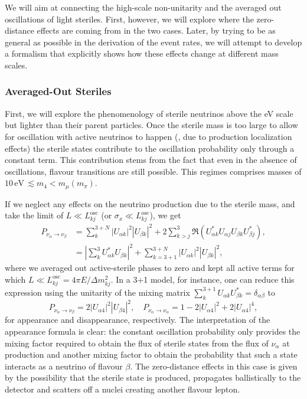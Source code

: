We will aim at connecting the high-scale non-unitarity and the averaged out oscillations of light steriles. First, however, we will explore where the zero-distance effects are coming from in the two cases. Later, by trying to be as general as possible in the derivation of the event rates, we will attempt to develop a formalism that explicitly shows how these effects change at different mass scales. 

\subsubsection{Averaged-Out Steriles} First, we will explore the phenomenology of sterile neutrinos above the eV scale but lighter than their parent particles. Once the sterile mass is too large to allow for oscillation with active neutrinos to happen (\eg, due to production localization effects) the sterile states contribute to the oscillation probability only through a constant term. This contribution stems from the fact that even in the absence of oscillations, flavour transitions are still possible. This regimes comprises masses of $10 \, \text{eV}\, \lesssim m_{4} < m_{\mu} (m_{\pi})$. 

If we neglect any effects on the neutrino production due to the sterile mass, and take the limit of $L \ll L^{\text{osc}}_{k j}$ (or $\sigma_x \ll L^{\text{osc}}_{k j}$), we get
%
\begin{align}
 P_{\nu_{\alpha} \to \nu_{\beta}} &= \sum_{k}^{3+N} |U_{\alpha k}|^2|U_{\beta k}|^2 + 2 \sum_{k > j}^{3}\Re{\left( U^*_{\alpha k} U_{\alpha j} U_{\beta k} U^*_{\beta j} \right)}, \nonumber \\
 &= \left| \sum_{k}^{3} U_{\alpha k}^* U_{\beta k} \right|^2 + \sum_{k=3+1}^{3+N} |U_{\alpha k}|^2 |U_{\beta k}|^2,
\end{align}
%
where we averaged out active-sterile phases to zero and kept all active terms for which $L \ll L^{\text{osc}}_{k j}= 4 \pi E / \Delta m^2_{k j}$. In a 3+1 model, for instance, one can reduce this expression using the unitarity of the mixing matrix $\sum_k^{3+1} U_{\alpha k} U_{\beta k}^* = \delta_{\alpha \beta}$ to
%
\begin{equation}
 P_{\nu_{\alpha} \to \nu_{\beta}} = 2 |U_{\alpha 4}|^2 |U_{\beta 4}|^2,\quad P_{\nu_{\alpha} \to \nu_{\alpha}} = 1 - 2 |U_{\alpha 4}|^2 + 2|U_{\alpha 4}|^4,\label{eq:AOS3+1dis}
\end{equation}
%
for appearance and disappearance, respectively. The interpretation of the appearance formula is clear: the constant oscillation probability only provides the mixing factor required to obtain the flux of sterile states from the flux of $\nu_{\alpha}$ at production and another mixing factor to obtain the probability that such a state interacts as a neutrino of flavour $\beta$. The zero-distance effects in this case is given by the possibility that the sterile state is produced, propagates ballistically to the detector and scatters off a nuclei creating another flavour lepton.

